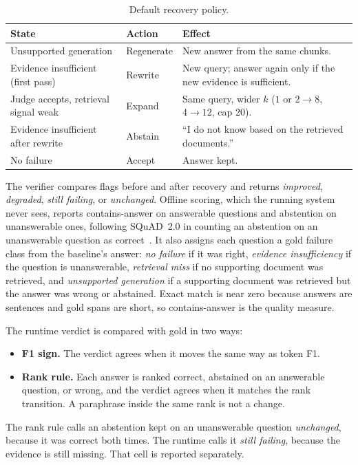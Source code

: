 \documentclass[12pt, a4paper, oneside]{report}
\begin{document}
\begin{table}[htbp]
\centering
\small
\begin{tabular}{@{}p{4.4cm}p{2.2cm}p{7.2cm}@{}}
\toprule
State & Action & Effect \\
\midrule
Unsupported generation & Regenerate & New answer from the same chunks. \\
Evidence insufficient (first pass) & Rewrite & New query; answer again only
if the new evidence is sufficient. \\
Judge accepts, retrieval signal weak & Expand & Same query, wider $k$
($1$ or $2 \to 8$, $4 \to 12$, cap 20). \\
Evidence insufficient after rewrite & Abstain & ``I do not know based on
the retrieved documents.'' \\
No failure & Accept & Answer kept. \\
\bottomrule
\end{tabular}
\caption{Default recovery policy.}
\label{tbl:actions}
\end{table}

The verifier compares flags before and after recovery and returns
\emph{improved}, \emph{degraded}, \emph{still failing}, or
\emph{unchanged}. Offline scoring, which the running system never sees,
reports contains-answer on answerable questions and abstention on
unanswerable ones, following SQuAD~2.0 in counting an abstention on an
unanswerable question as correct~\cite{rajpurkar2018squad}. It also assigns each question a gold failure class from
the baseline's answer: \emph{no failure} if it was right,
\emph{evidence insufficiency} if the question is unanswerable,
\emph{retrieval miss} if no supporting document was retrieved, and
\emph{unsupported generation} if a supporting document was retrieved but
the answer was wrong or abstained. Exact match is near zero because answers are sentences
and gold spans are short, so contains-answer is the quality measure.

The runtime verdict is compared with gold in two ways:
\begin{itemize}
\item \textbf{F1 sign.} The verdict agrees when it moves the same way as
  token F1.
\item \textbf{Rank rule.} Each answer is ranked correct, abstained on an
  answerable question, or wrong, and the verdict agrees when it matches the
  rank transition. A paraphrase inside the same rank is not a change.
\end{itemize}
The rank rule calls an abstention kept on an unanswerable question
\emph{unchanged}, because it was correct both times. The runtime calls it
\emph{still failing}, because the evidence is still missing. That cell is
reported separately.
\end{document}
